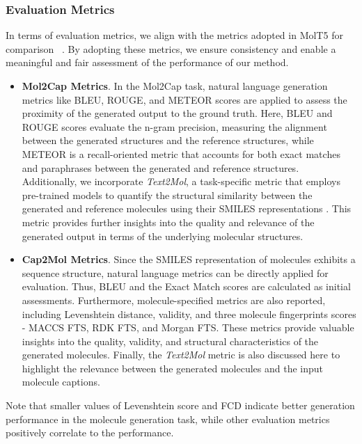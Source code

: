 \documentclass{article}
\theoremstyle{plain}
\theoremstyle{definition}
\theoremstyle{remark}
\begin{document}
\subsubsection{Evaluation Metrics}
In terms of evaluation metrics, we align with the metrics adopted in MolT5 for comparison ~\cite{edwards-etal-2022-translation}. By adopting these metrics, we ensure consistency and enable a meaningful and fair assessment of the performance of our method.
\begin{itemize}

\item \textbf{Mol2Cap Metrics}. 
In the Mol2Cap task, natural language generation metrics like BLEU, ROUGE, and METEOR scores are applied to assess the proximity of the generated output to the ground truth. 
Here, BLEU and ROUGE scores evaluate the n-gram precision, measuring the alignment between the generated structures and the reference structures, while METEOR is a recall-oriented metric that accounts for both exact matches and paraphrases between the generated and reference structures.
Additionally, we incorporate \emph{Text2Mol}, a task-specific metric that employs pre-trained models to quantify the structural similarity between the generated and reference molecules using their SMILES representations \cite{edwards2021text2mol}.
This metric provides further insights into the quality and relevance of the generated output in terms of the underlying molecular structures.

\item \textbf{Cap2Mol Metrics}. 
Since the SMILES representation of molecules exhibits a sequence structure, natural language metrics can be directly applied for evaluation. Thus, BLEU and the Exact Match scores are calculated as initial assessments. 
Furthermore, molecule-specified metrics are also reported, including Levenshtein distance, validity, and three molecule fingerprints scores - MACCS FTS, RDK FTS, and Morgan FTS. 
These metrics provide valuable insights into the quality, validity, and structural characteristics of the generated molecules. Finally, the \emph{Text2Mol} metric is also discussed here to highlight the relevance between the generated molecules and the input molecule captions. 
\end{itemize}


Note that smaller values of Levenshtein score and FCD indicate better generation performance in the molecule generation task, while other evaluation metrics positively correlate to the performance.
\end{document}
